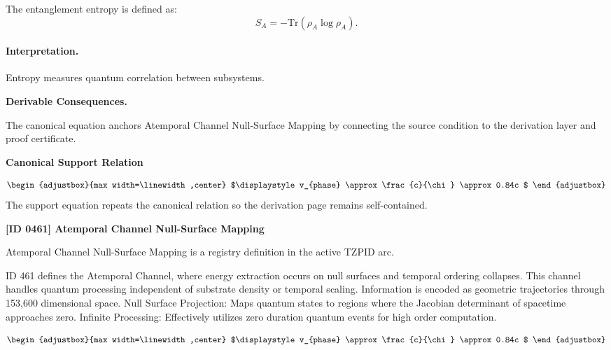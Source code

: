 The entanglement entropy is defined as:
\begin{equation}
S_A = -\mathrm{Tr}(\rho_A \log \rho_A).
\end{equation}

\paragraph{Interpretation.}
Entropy measures quantum correlation between subsystems.

\par\vspace{0.35em}
\noindent\textbf{Derivable Consequences.}\quad
\begingroup
\footnotesize
\raggedright
The canonical equation anchors Atemporal Channel Null-Surface Mapping by connecting the source condition to the derivation layer and proof certificate.
\par\endgroup

\noindent\textbf{Canonical Support Relation}\par
\[
\begin{adjustbox}{max width=\linewidth,center}
$\displaystyle
v_{phase} \approx \frac{c}{\chi} \approx 0.84c
$
\end{adjustbox}
\]
\noindent The support equation repeats the canonical relation so the derivation page remains self-contained.\par

\clearpage
\noindent\textbf{[ID 0461] Atemporal Channel Null-Surface Mapping}\par
\vspace{0.35em}
\begingroup\small
{}
Atemporal Channel Null-Surface Mapping is a registry definition in the active TZPID arc.

ID 461 defines the Atemporal Channel, where energy extraction occurs on null surfaces and temporal ordering collapses. This channel handles quantum processing independent of substrate density or temporal scaling. Information is encoded as geometric trajectories through 153,600 dimensional space. Null Surface Projection: Maps quantum states to regions where the Jacobian determinant of spacetime approaches zero. Infinite Processing: Effectively utilizes zero duration quantum events for high order computation.

\[
\begin{adjustbox}{max width=\linewidth,center}
$\displaystyle
v_{phase} \approx \frac{c}{\chi} \approx 0.84c
$
\end{adjustbox}
\]

